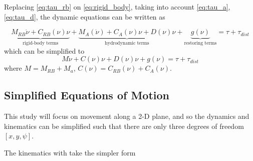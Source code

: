 \par Replacing \eqref{eq:tau_rb} on \eqref{eq:rigid_body}, taking into account \eqref{eq:tau_a}, \eqref{eq:tau_d}, the dynamic equations can
be written as

\begin{equation}
    \underbrace{M_{RB}\dot{\nu} + C_{RB}(\nu)\nu}_{\text{rigid-body terms}} + \underbrace{M_A(\dot{\nu}) + C_A(\nu)\nu + D(\nu)\nu}_{\text{hydrodynamic terms}} + \underbrace{g(\nu)}_{\text{restoring terms}} = \tau + \tau_{dist}
\end{equation}
which can be simplified to
\begin{equation}
    M\dot{\nu} + C(\nu)\nu + D(\nu)\nu + g(\nu) = \tau + \tau_{dist}
\end{equation}
where $M = M_{RB} + M_a$, $C(\nu) = C_{RB}(\nu) + C_A(\nu)$.

\subsection{Simplified Equations of Motion}

\par This study will focus on movement along a 2-D plane, and so the dynamics and kinematics can be simplified such that there are only three degrees of freedom $[x,y,\psi]$.
\par The kinematics with take the simpler form 

